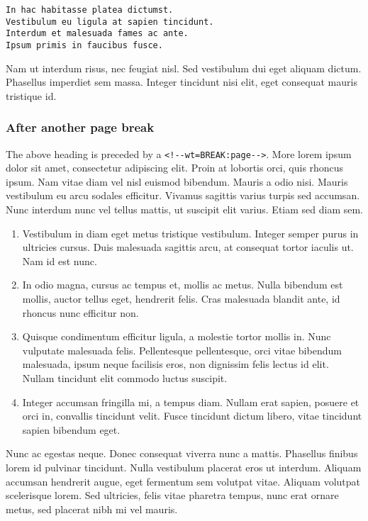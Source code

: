 \documentclass[11pt]{article}
\begin{document}
\begin{verbatim}
In hac habitasse platea dictumst.
Vestibulum eu ligula at sapien tincidunt.
Interdum et malesuada fames ac ante.
Ipsum primis in faucibus fusce.
\end{verbatim}

Nam ut interdum risus, nec feugiat nisl. Sed vestibulum dui eget aliquam
dictum. Phasellus imperdiet sem massa. Integer tincidunt nisi elit, eget
consequat mauris tristique id.

\hypertarget{after-another-page-break}{%
\subsubsection{After another page
break}\label{after-another-page-break}}

The above heading is preceded by a
\texttt{\textless{}!-\/-wt=BREAK:page-\/-\textgreater{}}. More lorem
ipsum dolor sit amet, consectetur adipiscing elit. Proin at lobortis
orci, quis rhoncus ipsum. Nam vitae diam vel nisl euismod bibendum.
Mauris a odio nisi. Mauris vestibulum eu arcu sodales efficitur. Vivamus
sagittis varius turpis sed accumsan. Nunc interdum nunc vel tellus
mattis, ut suscipit elit varius. Etiam sed diam sem.

\begin{enumerate}
\def\labelenumi{\arabic{enumi}.}
\item
  Vestibulum in diam eget metus tristique vestibulum. Integer semper
  purus in ultricies cursus. Duis malesuada sagittis arcu, at consequat
  tortor iaculis ut. Nam id est nunc.
\item
  In odio magna, cursus ac tempus et, mollis ac metus. Nulla bibendum
  est mollis, auctor tellus eget, hendrerit felis. Cras malesuada
  blandit ante, id rhoncus nunc efficitur non.
\item
  Quisque condimentum efficitur ligula, a molestie tortor mollis in.
  Nunc vulputate malesuada felis. Pellentesque pellentesque, orci vitae
  bibendum malesuada, ipsum neque facilisis eros, non dignissim felis
  lectus id elit. Nullam tincidunt elit commodo luctus suscipit.
\item
  Integer accumsan fringilla mi, a tempus diam. Nullam erat sapien,
  posuere et orci in, convallis tincidunt velit. Fusce tincidunt dictum
  libero, vitae tincidunt sapien bibendum eget.
\end{enumerate}

Nunc ac egestas neque. Donec consequat viverra nunc a mattis. Phasellus
finibus lorem id pulvinar tincidunt. Nulla vestibulum placerat eros ut
interdum. Aliquam accumsan hendrerit augue, eget fermentum sem volutpat
vitae. Aliquam volutpat scelerisque lorem. Sed ultricies, felis vitae
pharetra tempus, nunc erat ornare metus, sed placerat nibh mi vel
mauris.
\end{document}
